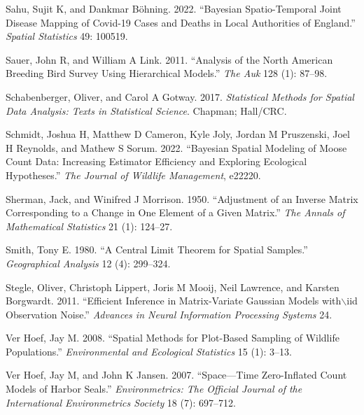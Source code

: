 \documentclass[smallextended]{svjour3}       %
\newlength{\cslhangindent}
\newlength{\cslentryspacingunit} %
\newenvironment{CSLReferences}[2] %
 {%
  \setlength{\parindent}{0pt}
  \ifodd #1
  \let\oldpar\par
  \def\par{\hangindent=\cslhangindent\oldpar}
  \fi
  \setlength{\parskip}{#2\cslentryspacingunit}
 }%
 {}
\begin{document}
\begin{CSLReferences}{1}{0}
\leavevmode{}%
Sahu, Sujit K, and Dankmar Böhning. 2022. {``Bayesian Spatio-Temporal
Joint Disease Mapping of Covid-19 Cases and Deaths in Local Authorities
of England.''} \emph{Spatial Statistics} 49: 100519.

\leavevmode{}%
Sauer, John R, and William A Link. 2011. {``Analysis of the North
American Breeding Bird Survey Using Hierarchical Models.''} \emph{The
Auk} 128 (1): 87--98.

\leavevmode{}%
Schabenberger, Oliver, and Carol A Gotway. 2017. \emph{Statistical
Methods for Spatial Data Analysis: Texts in Statistical Science}.
Chapman; Hall/CRC.

\leavevmode{}%
Schmidt, Joshua H, Matthew D Cameron, Kyle Joly, Jordan M Pruszenski,
Joel H Reynolds, and Mathew S Sorum. 2022. {``Bayesian Spatial Modeling
of Moose Count Data: Increasing Estimator Efficiency and Exploring
Ecological Hypotheses.''} \emph{The Journal of Wildlife Management},
e22220.

\leavevmode{}%
Sherman, Jack, and Winifred J Morrison. 1950. {``Adjustment of an
Inverse Matrix Corresponding to a Change in One Element of a Given
Matrix.''} \emph{The Annals of Mathematical Statistics} 21 (1): 124--27.

\leavevmode{}%
Smith, Tony E. 1980. {``A Central Limit Theorem for Spatial Samples.''}
\emph{Geographical Analysis} 12 (4): 299--324.

\leavevmode{}%
Stegle, Oliver, Christoph Lippert, Joris M Mooij, Neil Lawrence, and
Karsten Borgwardt. 2011. {``Efficient Inference in Matrix-Variate
Gaussian Models with\(\backslash\)iid Observation Noise.''}
\emph{Advances in Neural Information Processing Systems} 24.

\leavevmode{}%
Ver Hoef, Jay M. 2008. {``Spatial Methods for Plot-Based Sampling of
Wildlife Populations.''} \emph{Environmental and Ecological Statistics}
15 (1): 3--13.

\leavevmode{}%
Ver Hoef, Jay M, and John K Jansen. 2007. {``Space---Time Zero-Inflated
Count Models of Harbor Seals.''} \emph{Environmetrics: The Official
Journal of the International Environmetrics Society} 18 (7): 697--712.


\end{CSLReferences}
\end{document}
